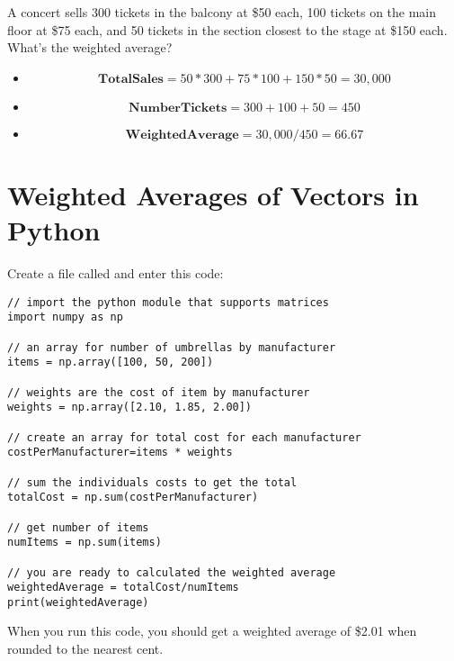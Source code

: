 \begin{Exercise}[title={Weighted Average}, label=weightedAverage]
  A concert sells 300 tickets in the balcony at \$50 each, 100 tickets on the main floor at \$75 each, and 50 tickets in the section closest to the stage at \$150 each. What's the weighted average?
\end{Exercise}
\begin{Answer}[ref=weightedAverage]
 \begin{itemize}
    \item\[\mathbf{TotalSales} = 50*300 + 75*100 + 150*50 = 30,000\]
	\item\[\mathbf{NumberTickets} = 300 + 100 + 50 = 450\]
	\item\[\mathbf{WeightedAverage} = 30,000/450 = 66.67\]
 \end{itemize} 
\end{Answer}

\section{Weighted Averages of Vectors in Python}

Create a file called  and enter this code:

\begin{Verbatim}
// import the python module that supports matrices
import numpy as np

// an array for number of umbrellas by manufacturer
items = np.array([100, 50, 200])

// weights are the cost of item by manufacturer
weights = np.array([2.10, 1.85, 2.00])

// create an array for total cost for each manufacturer
costPerManufacturer=items * weights

// sum the individuals costs to get the total
totalCost = np.sum(costPerManufacturer)

// get number of items
numItems = np.sum(items) 

// you are ready to calculated the weighted average
weightedAverage = totalCost/numItems
print(weightedAverage)

\end{Verbatim}

When you run this code, you should get a weighted average of \$2.01 when rounded to the nearest cent.
